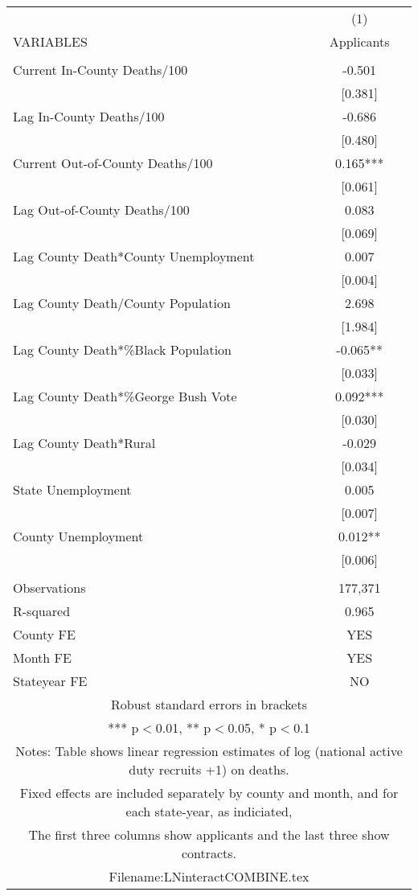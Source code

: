 \documentclass[]{article}
\begin{document}
\begin{tabular}{lc} \hline
 & (1) \\
VARIABLES & Applicants \\ \hline
 &  \\
Current In-County Deaths/100 & -0.501 \\
 & [0.381] \\
Lag In-County Deaths/100 & -0.686 \\
 & [0.480] \\
Current Out-of-County Deaths/100 & 0.165*** \\
 & [0.061] \\
Lag Out-of-County Deaths/100 & 0.083 \\
 & [0.069] \\
Lag County Death*County Unemployment & 0.007 \\
 & [0.004] \\
Lag County Death/County Population & 2.698 \\
 & [1.984] \\
Lag County Death*\%Black Population & -0.065** \\
 & [0.033] \\
Lag County Death*\%George Bush Vote & 0.092*** \\
 & [0.030] \\
Lag County Death*Rural & -0.029 \\
 & [0.034] \\
State Unemployment & 0.005 \\
 & [0.007] \\
County Unemployment & 0.012** \\
 & [0.006] \\
 &  \\
Observations & 177,371 \\
R-squared & 0.965 \\
County FE & YES \\
Month FE & YES \\
 Stateyear FE & NO \\ \hline
\multicolumn{2}{c}{ Robust standard errors in brackets} \\
\multicolumn{2}{c}{ *** p$<$0.01, ** p$<$0.05, * p$<$0.1} \\
\multicolumn{2}{c}{ Notes: Table shows linear regression estimates of log (national active duty recruits +1) on deaths.} \\
\multicolumn{2}{c}{ Fixed effects are included separately by county and month, and for each state-year, as indiciated,} \\
\multicolumn{2}{c}{ The first three columns show applicants and the last three show contracts.} \\
\multicolumn{2}{c}{ Filename:LNinteractCOMBINE.tex} \\
\end{tabular}
\end{document}
